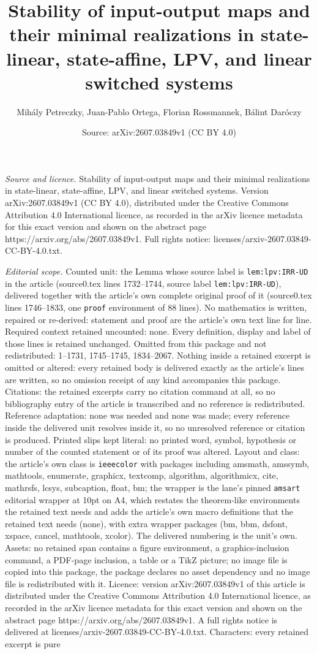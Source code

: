 \documentclass[10pt,a4paper]{amsart}
\title[Stability of input-output maps and their minimal realization]{Stability of input-output maps and their minimal realizations in state-linear, state-affine, LPV, and linear switched systems}
\author{Mih\'aly Petreczky, Juan-Pablo Ortega, Florian Rossmannek, B\'alint Dar\'oczy}
\date{Source: arXiv:2607.03849v1 (CC BY 4.0)}
\begin{document}
\maketitle

\noindent\emph{Source and licence.} Stability of input-output maps and their minimal realizations in state-linear, state-affine, LPV, and linear switched systems. Version arXiv:2607.03849v1 (CC BY 4.0), distributed under the Creative Commons Attribution 4.0 International licence, as recorded in the arXiv licence metadata for this exact version and shown on the abstract page https://arxiv.org/abs/2607.03849v1. Full rights notice: licenses/arxiv-2607.03849-CC-BY-4.0.txt.\par\smallskip

\noindent\textit{Editorial scope.} Counted unit: the Lemma whose source label is \texttt{lem:lpv:IRR-UD} in the article (source0.tex lines 1732--1744, source label \texttt{lem:lpv:IRR-UD}), delivered together with the article's own complete original proof of it (source0.tex lines 1746--1833, one \texttt{proof} environment of 88 lines). No mathematics is written, repaired or re-derived: statement and proof are the article's own text line for line. Required context retained uncounted: none. Every definition, display and label of those lines is retained unchanged. Omitted from this package and not redistributed: 1--1731, 1745--1745, 1834--2067. Nothing inside a retained excerpt is omitted or altered: every retained body is delivered exactly as the article's lines are written, so no omission receipt of any kind accompanies this package. Citations: the retained excerpts carry no citation command at all, so no bibliography entry of the article is transcribed and no reference is redistributed. Reference adaptation: none was needed and none was made; every reference inside the delivered unit resolves inside it, so no unresolved reference or citation is produced. Printed slips kept literal: no printed word, symbol, hypothesis or number of the counted statement or of its proof was altered. Layout and class: the article's own class is \texttt{ieeecolor} with packages including amsmath, amssymb, mathtools, enumerate, graphicx, textcomp, algorithm, algorithmicx, cite, mathrsfs, lcsys, subcaption, float, bm; the wrapper is the lane's pinned \texttt{amsart} editorial wrapper at 10pt on A4, which restates the theorem-like environments the retained text needs and adds the article's own macro definitions that the retained text needs (none), with extra wrapper packages (bm, bbm, dsfont, xspace, cancel, mathtools, xcolor). The delivered numbering is the unit's own. Assets: no retained span contains a figure environment, a graphics-inclusion command, a PDF-page inclusion, a table or a TikZ picture; no image file is copied into this package, the package declares no asset dependency and no image file is redistributed with it. Licence: version arXiv:2607.03849v1 of this article is distributed under the Creative Commons Attribution 4.0 International licence, as recorded in the arXiv licence metadata for this exact version and shown on the abstract page https://arxiv.org/abs/2607.03849v1. A full rights notice is delivered at licenses/arxiv-2607.03849-CC-BY-4.0.txt. Characters: every retained excerpt is pure 
\end{document}
